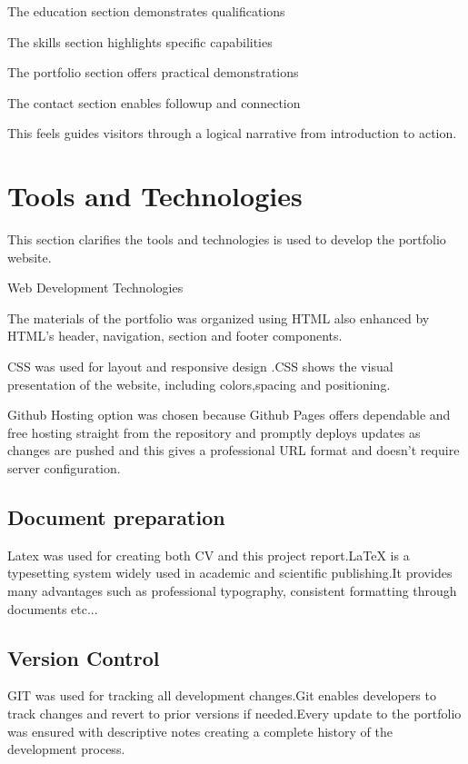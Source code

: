 \documentclass[12pt,a4paper]{article}
\begin{document}
The education section demonstrates qualifications 

The skills section highlights specific capabilities 

The portfolio section offers practical demonstrations 

The contact section enables followup and connection

This feels guides visitors through a logical narrative from introduction to action.

\section{Tools and Technologies}

This section clarifies the tools and technologies is used to develop the portfolio website.


 Web Development Technologies

The materials of the portfolio was organized using HTML also enhanced by HTML's header, navigation, section and footer components. 

CSS was used for layout and responsive design .CSS shows the visual presentation of the website, including colors,spacing and positioning.

Github Hosting option was chosen because Github Pages offers dependable and free hosting straight from the repository and promptly deploys updates as changes are pushed and this gives a professional URL format and doesn't require server configuration.

\subsection{Document preparation}

Latex was used for creating both CV and this project report.LaTeX is a typesetting system widely used in academic and scientific publishing.It provides many advantages such as professional typography, consistent formatting through documents etc...


\subsection{Version Control}

GIT was used for tracking all development changes.Git enables developers to track changes and revert to prior versions if needed.Every update to the portfolio was ensured with descriptive notes creating a complete history of the development process.
\end{document}

